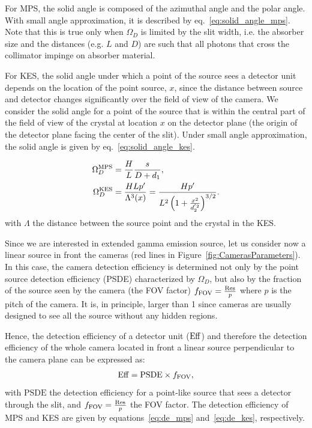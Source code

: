 \documentclass[a4paper,english,12pt]{article}
\begin{document}
For MPS, the solid angle is composed of the azimuthal angle and the polar angle. With small angle approximation, it is described by eq.~\ref{eq:solid_angle_mps}. Note that this is true only when $\Omega_D$ is limited by the slit width, i.e. the absorber size and the distances (e.g. $L$ and $D$) are such that all photons that cross the collimator impinge on absorber material. 

For KES, the solid angle under which a point of the source sees a detector unit depends on the location of the point source, $x$, since the distance between source and detector changes significantly over the field of view of the camera. We
consider the solid angle for a point of the source that is within the central
part of the field of view of the crystal at location $x$ on the detector plane
(the origin of the detector plane facing the center of the slit). Under small
angle approximation, the solid angle is given by eq.~\ref{eq:solid_angle_kes}. 

\begin{align}  
  \Omega_D^{\textrm{MPS}} & = \frac{H}{L} \frac{s}{D+d_1} \label{eq:solid_angle_mps}, \\
	\Omega_D^{\textrm{KES}} & = \frac{H L p'}{\Lambda^3(x)} =  \frac{H p'}{L^2 \left( 1+\frac{x^2}{d_2^{'2}} \right)^{3/2}}. \label{eq:solid_angle_kes} 
\end{align}
with $\Lambda$ the distance between the source point and the crystal in the KES.


Since we are interested in extended gamma emission source, let us consider now a linear source in front the cameras (red lines in Figure~\ref{fig:CamerasParameters}). In this case, the camera detection efficiency is determined not only by the point source detection efficiency (PSDE) characterized by $\Omega_D$, but also by the fraction of the source seen by the camera (the FOV factor) $f_{\textrm{FOV}} = \frac{\textrm{Res}_{}}{p}$ where $p$ is the pitch of the camera. It is, in principle, larger than 1 since cameras are usually designed to see all the source without any hidden regions.

Hence, the detection efficiency of a detector unit ($\textrm{Eff}_{}$) and therefore the detection efficiency of the whole camera located in front a linear source perpendicular to  the camera plane can be expressed as:
\begin{align} 
	\textrm{Eff}_{} = \textrm{PSDE} \times f_{\textrm{FOV}},
\end{align}
with $\textrm{PSDE}$ the detection efficiency for a point-like source that sees a detector through the slit, and $f_{\textrm{FOV}} = \frac{\textrm{Res}_{}}{p}$ the FOV factor. The detection efficiency of MPS and KES are given by equations~\ref{eq:de_mps} and~\ref{eq:de_kes}, respectively.
\end{document}
